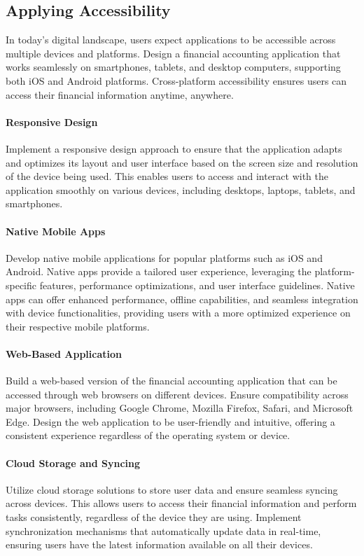 \subsection{Applying Accessibility}

In today's digital landscape, users expect applications to be accessible across multiple devices and platforms. 
Design a financial accounting application that works seamlessly on smartphones, tablets, and desktop computers, 
supporting both iOS and Android platforms. Cross-platform accessibility ensures users can access their financial 
information anytime, anywhere.

\paragraph{Responsive Design}
Implement a responsive design approach to ensure that the application adapts and optimizes its layout and user 
interface based on the screen size and resolution of the device being used. This enables users to access and interact 
with the application smoothly on various devices, including desktops, laptops, tablets, and smartphones.

\paragraph{Native Mobile Apps}
Develop native mobile applications for popular platforms such as iOS and Android. Native apps provide a tailored 
user experience, leveraging the platform-specific features, performance optimizations, and user interface guidelines. 
Native apps can offer enhanced performance, offline capabilities, and seamless integration with device functionalities, 
providing users with a more optimized experience on their respective mobile platforms.

\paragraph{Web-Based Application}
Build a web-based version of the financial accounting application that can be accessed through web browsers on 
different devices. Ensure compatibility across major browsers, including Google Chrome, Mozilla Firefox, Safari, 
and Microsoft Edge. Design the web application to be user-friendly and intuitive, offering a consistent experience 
regardless of the operating system or device.

\paragraph{Cloud Storage and Syncing}
Utilize cloud storage solutions to store user data and ensure seamless syncing across devices. This allows users 
to access their financial information and perform tasks consistently, regardless of the device they are using. 
Implement synchronization mechanisms that automatically update data in real-time, ensuring users have the latest 
information available on all their devices.

